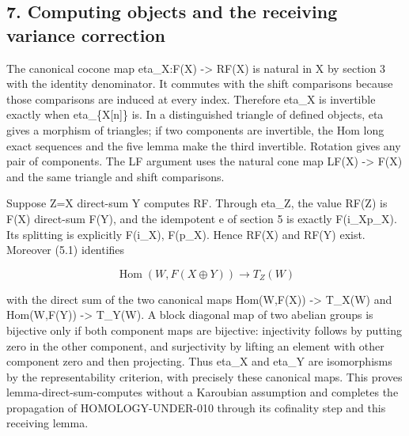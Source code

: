 \subsection{7. Computing objects and the receiving variance correction}\label{proofs-4166-5089-computing-objects-and-the-receiving-variance-correction}

The canonical cocone map eta\_\allowbreak{}X:\allowbreak{}F(X)\allowbreak{} \allowbreak{}-> RF(X)\allowbreak{} is natural in X by section 3 with the identity denominator. It commutes with the shift comparisons because those comparisons are induced at every index. Therefore eta\_\allowbreak{}X is invertible exactly when eta\_\allowbreak{}\{X[n]\allowbreak{}\} is. In a distinguished triangle of defined objects,\allowbreak{} eta gives a morphism of triangles; if two components are invertible,\allowbreak{} the Hom long exact sequences and the five lemma make the third invertible. Rotation gives any pair of components. The LF argument uses the natural cone map LF(X)\allowbreak{} \allowbreak{}-> F(X)\allowbreak{} and the same triangle and shift comparisons.

Suppose Z\allowbreak{}=X direct-sum Y computes RF. Through eta\_\allowbreak{}Z,\allowbreak{} the value RF(Z)\allowbreak{} is F(X)\allowbreak{} direct-sum F(Y)\allowbreak{},\allowbreak{} and the idempotent e of section 5 is exactly F(i\_\allowbreak{}Xp\_\allowbreak{}X)\allowbreak{}. Its splitting is explicitly F(i\_\allowbreak{}X)\allowbreak{},\allowbreak{} F(p\_\allowbreak{}X)\allowbreak{}. Hence RF(X)\allowbreak{} and RF(Y)\allowbreak{} exist. Moreover (5.1)\allowbreak{} identifies

\[
 \operatorname{Hom}(W,F(X\oplus Y))\longrightarrow T_Z(W)
\]

with the direct sum of the two canonical maps Hom(W,\allowbreak{}F(X)\allowbreak{})\allowbreak{} \allowbreak{}-> T\_\allowbreak{}X(W)\allowbreak{} and Hom(W,\allowbreak{}F(Y)\allowbreak{})\allowbreak{} \allowbreak{}-> T\_\allowbreak{}Y(W)\allowbreak{}. A block diagonal map of two abelian groups is bijective only if both component maps are bijective:\allowbreak{} injectivity follows by putting zero in the other component,\allowbreak{} and surjectivity by lifting an element with other component zero and then projecting. Thus eta\_\allowbreak{}X and eta\_\allowbreak{}Y are isomorphisms by the representability criterion,\allowbreak{} with precisely these canonical maps. This proves lemma-direct-sum-computes without a Karoubian assumption and completes the propagation of HOMOLOGY-UNDER-010 through its cofinality step and this receiving lemma.

